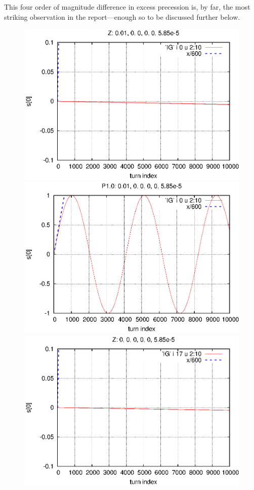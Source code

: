\documentclass[]{article}
\begin{document}
This four order of magnitude difference in excess precession is, 
by far, the most striking observation in the report---enough so to 
be discussed further below.
%
\begin{figure}[h]
\centering
\includegraphics[scale=0.6]{eps/SpinEvolve0.Z.eps}
\includegraphics[scale=0.6]{eps/SpinEvolve0.P1.0.eps}
\includegraphics[scale=0.6]{eps/SpinEvolve17.Z.eps}

\end{figure}
\end{document}
